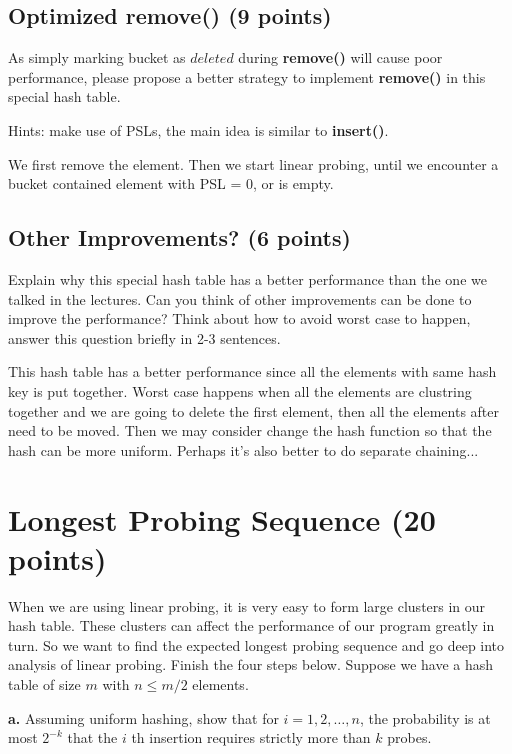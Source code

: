 \documentclass[11pt]{exam}
\begin{document}
\subsection{Optimized remove() (9 points)}
As simply marking bucket as $deleted$ during \textbf{remove()} will cause poor performance, please propose a better strategy to implement \textbf{remove()} in this special hash table.

Hints: make use of PSLs, the main idea is similar to \textbf{insert()}.
\begin{solution}
    We first remove the element. Then we start linear probing,
until we encounter a bucket contained element with PSL = 0, or is empty.
\end{solution}

\subsection{Other Improvements? (6 points)}
Explain why this special hash table has a better performance than the one we talked in the lectures. Can you think of other improvements can be done to improve the performance? Think about how to avoid worst case to happen, answer this question briefly in 2-3 sentences.
\begin{solution}
    This hash table has a better performance since all the elements with same hash key is put together.
Worst case happens when all the elements are clustring together and we are going to delete the first element, then all the elements after 
need to be moved. Then we may consider change the hash function so that 
the hash can be more uniform. Perhaps it's also better to do separate chaining...
\end{solution}

\section{Longest Probing Sequence (20 points)}
When we are using linear probing, it is very easy to form large clusters in our hash table. These clusters can affect the performance of our program greatly in turn. So we want to find the expected longest probing sequence and go deep into analysis of linear probing. Finish the four steps below. Suppose we have a hash table of size $m$ with $n \leq m / 2$ elements.


\textbf{a.} Assuming uniform hashing, show that for $i=1,2, \ldots, n$, the probability is at most $2^{-k}$ that the $i$ th insertion requires strictly more than $k$ probes.
\end{document}

